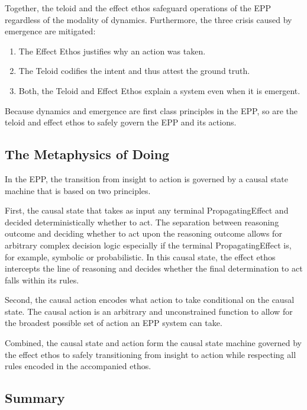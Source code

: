 Together, the teloid and the effect ethos safeguard operations of the EPP regardless of the modality of dynamics. Furthermore, the three crisis caused by emergence are mitigated:

\begin{enumerate}
	\item The Effect Ethos justifies why an action was taken. 
	\item The Teloid codifies the intent and thus attest the ground truth.
	\item Both, the Teloid and Effect Ethos explain a system even when it is emergent.
\end{enumerate}

Because dynamics and emergence are first class principles in the EPP, so are the
teloid and effect ethos to safely govern the EPP and its actions. 

\subsection{The Metaphysics of Doing} 
\label{sec:metaphysics_doing}

In the EPP, the transition from insight to action is governed by a causal state machine that is based on two principles.

 First, the causal state that takes as input any terminal PropagatingEffect and decided deterministically whether to act. The separation between reasoning outcome and deciding whether to act upon the reasoning outcome allows for arbitrary complex decision logic especially if the terminal PropagatingEffect is, for example, symbolic or probabilistic. In this causal state, the effect ethos intercepts the line of reasoning and decides whether the final determination to act falls within its rules. 
 
 Second, the causal action encodes what action to take conditional on the causal state. The causal action is an arbitrary and unconstrained function to allow for the broadest possible set of action an EPP system can take. 
 
 Combined, the causal state and action form the causal state machine governed by the effect ethos to safely transitioning from insight to action while respecting all rules encoded in the accompanied ethos. 

\subsection{Summary} 
\label{sec:metaphysics_summary}

